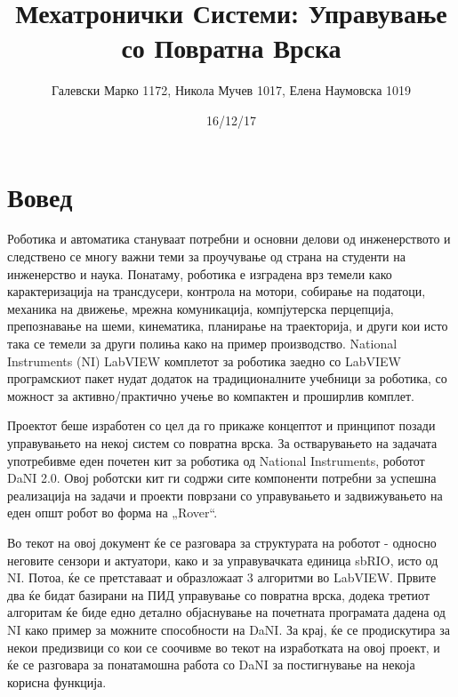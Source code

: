 \documentclass{article}
\title{Мехатронички Системи: Управување со Повратна Врска}
\date{16/12/17}
\author{Галевски Марко 1172, Никола Мучев 1017, Елена Наумовска 1019}
\begin{document}
    \maketitle{}
    \newpage
    \tableofcontents
    \newpage

\section{Вовед}
Роботика и автоматика стануваат потребни и основни делови од инженерството и следствено се многу важни теми за проучување од страна на студенти на инженерство и наука. Понатаму, роботика е изградена врз темели како карактеризација на трансдусери, контрола на мотори, собирање на податоци, механика на движење, мрежна комуникација, компјутерска перцепција, препознавање на шеми, кинематика, планирање на траекторија, и други кои исто така се темели за други полиња како на пример производство. National Instruments (NI) LabVIEW комплетот за роботика заедно со LabVIEW програмскиот пакет нудат додаток на традиционалните учебници за роботика, со можност за активно/практично учење во компактен и проширлив комплет.


Проектот беше изработен со цел да го прикаже концептот и принципот позади управувањето на некој систем со повратна врска. За остварувањето на задачата употребивме еден почетен кит за роботика од National Instruments, роботот DaNI 2.0. Овој роботски кит ги содржи сите компоненти потребни за успешна реализација на задачи и проекти поврзани со управувањето и задвижувањето на еден општ робот во форма на „Rover“. 

Во текот на овој документ ќе се разговара за структурата на роботот - односно неговите сензори и актуатори, како и за управувачката единица sbRIO, исто од NI. Потоа, ќе се претставаат и образложаат 3 алгоритми во LabVIEW. Првите два ќе бидат базирани на ПИД управување со повратна врска, додека третиот алгоритам ќе биде едно детално објаснување на почетната програмата дадена од NI како пример за можните способности на DaNI. За крај, ќе се продискутира за некои предизвици со кои се соочивме во текот на изработката на овој проект, и ќе се разговара за понатамошна работа со DaNI за постигнување на некоја корисна функција.
\end{document}
